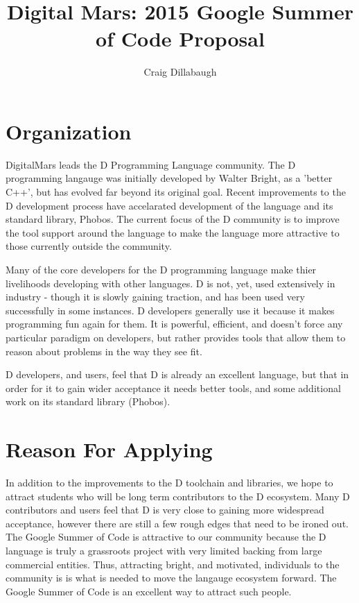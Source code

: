 \documentclass[a4paper,12pt]{article}
\title{Digital Mars: 2015 Google Summer of Code Proposal}
\author{Craig Dillabaugh}
\begin{document}
\maketitle

\section{Organization}

DigitalMars leads the D Programming Language community.   The D programming
langauge was initially developed by Walter Bright, as a 'better C++', but
has evolved far beyond its original goal.
Recent improvements to 
the D development process have accelarated development of the language and
its standard library, Phobos.
The 
current focus of the D community is to improve the tool support around the 
language to make the language more attractive to those currently outside the 
community.  

Many of the core developers for the D programming language make thier 
livelihoods developing with other languages.  D is not, yet, used extensively
in industry - though it is slowly gaining traction, and has been used very 
successfully in some instances.
D developers generally use it because it makes programming fun again for them.  
It is 
powerful, efficient, and doesn't force any particular paradigm on developers,
but rather provides tools that allow them to reason about problems in the way 
they see fit. 

D developers, and users, feel that D is already an excellent language, but 
that in order
for it to gain wider acceptance it needs better tools, and some additional 
work on its standard library (Phobos).  


\section{Reason For Applying}

In addition to the improvements to the D toolchain and libraries, we 
hope to attract students who will be long term contributors to the D ecosystem.
Many D contributors and users feel that D is very close to gaining more
widespread acceptance, however there are still a few rough edges that
need to be ironed out. 
The Google Summer of Code is attractive to our community because the D 
language is truly a grassroots project with very limited backing from 
large commercial entities.  
Thus, attracting bright, and motivated, individuals to the community is
is what is needed to move the langauge ecosystem forward.
The Google Summer of Code is an excellent way to attract such people.
\end{document}
